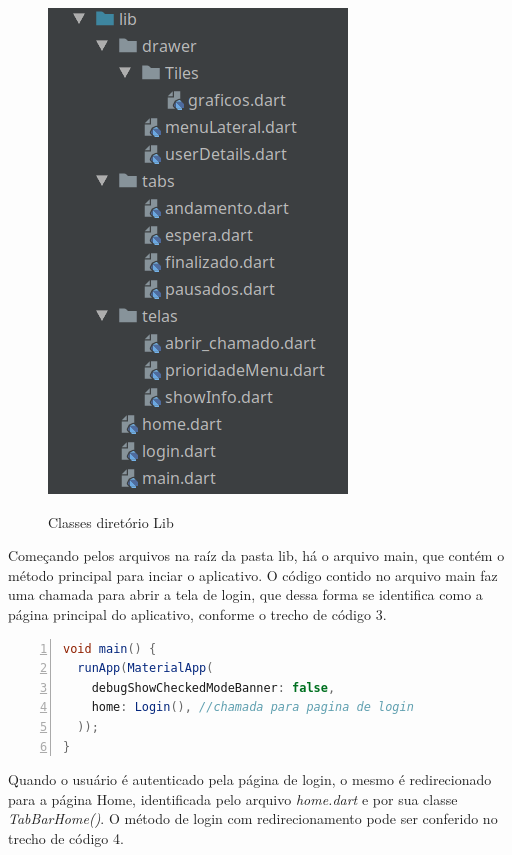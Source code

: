  \begin{figure}[htb]
     \caption{Classes diretório Lib}
     \centering
     \begin{frame}{
     \includegraphics [scale = 0.8]{img/arquitetura_lib}}
     \end{frame}
     \label{fig:arquitetura_lib}
 \end{figure}

Começando pelos arquivos na raíz da pasta lib, há o arquivo main, que contém o método principal para inciar o aplicativo. O código contido no arquivo main faz uma chamada para abrir a tela de login, que dessa forma se identifica como a página principal do aplicativo, conforme o trecho de código 3.

\newpage

\begin{lstlisting}[numbers=left, language=Java, style=mycode, caption={Trecho de Código página do main()}, label={lst:main-code}]
void main() {
  runApp(MaterialApp(
    debugShowCheckedModeBanner: false,
    home: Login(), //chamada para pagina de login
  ));
}

\end{lstlisting}
\justifying\setlength{\parindent}{1,25cm} 

Quando o usuário é autenticado pela página de login, o mesmo é redirecionado para a página Home, identificada pelo arquivo \textit{home.dart} e por sua classe \textit{TabBarHome()}. O método de login com redirecionamento pode ser conferido no trecho de código 4.

